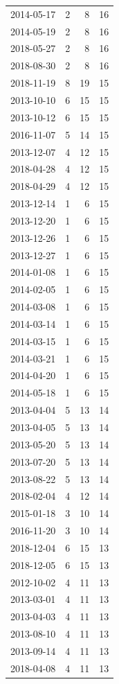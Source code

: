 \begin{tabular}{lrrr}
2014-05-17 & 2 & 8 & 16 \\
2014-05-19 & 2 & 8 & 16 \\
2018-05-27 & 2 & 8 & 16 \\
2018-08-30 & 2 & 8 & 16 \\
2018-11-19 & 8 & 19 & 15 \\
2013-10-10 & 6 & 15 & 15 \\
2013-10-12 & 6 & 15 & 15 \\
2016-11-07 & 5 & 14 & 15 \\
2013-12-07 & 4 & 12 & 15 \\
2018-04-28 & 4 & 12 & 15 \\
2018-04-29 & 4 & 12 & 15 \\
2013-12-14 & 1 & 6 & 15 \\
2013-12-20 & 1 & 6 & 15 \\
2013-12-26 & 1 & 6 & 15 \\
2013-12-27 & 1 & 6 & 15 \\
2014-01-08 & 1 & 6 & 15 \\
2014-02-05 & 1 & 6 & 15 \\
2014-03-08 & 1 & 6 & 15 \\
2014-03-14 & 1 & 6 & 15 \\
2014-03-15 & 1 & 6 & 15 \\
2014-03-21 & 1 & 6 & 15 \\
2014-04-20 & 1 & 6 & 15 \\
2014-05-18 & 1 & 6 & 15 \\
2013-04-04 & 5 & 13 & 14 \\
2013-04-05 & 5 & 13 & 14 \\
2013-05-20 & 5 & 13 & 14 \\
2013-07-20 & 5 & 13 & 14 \\
2013-08-22 & 5 & 13 & 14 \\
2018-02-04 & 4 & 12 & 14 \\
2015-01-18 & 3 & 10 & 14 \\
2016-11-20 & 3 & 10 & 14 \\
2018-12-04 & 6 & 15 & 13 \\
2018-12-05 & 6 & 15 & 13 \\
2012-10-02 & 4 & 11 & 13 \\
2013-03-01 & 4 & 11 & 13 \\
2013-04-03 & 4 & 11 & 13 \\
2013-08-10 & 4 & 11 & 13 \\
2013-09-14 & 4 & 11 & 13 \\
2018-04-08 & 4 & 11 & 13 \\

\end{tabular}
